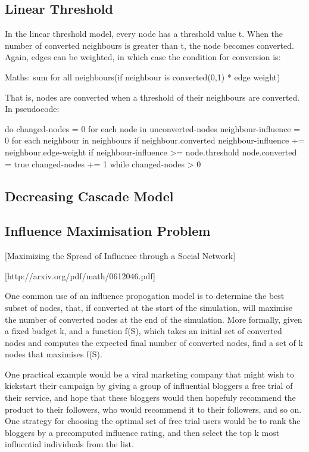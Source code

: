 \subsection{Linear Threshold}
 In the linear threshold model, every node has a threshold value t. When the number of converted neighbours is greater than t, the node becomes converted. Again, edges can be weighted, in which case the condition for conversion is:

Maths: sum for all neighbours(if neighbour is converted(0,1) * edge weight)

That is, nodes are converted when a threshold of their neighbours are converted. In pseudocode:

do {
  changed-nodes = 0
  for each node in unconverted-nodes {
    neighbour-influence = 0
    for each neighbour in neighbours {
      if neighbour.converted {
        neighbour-influence += neighbour.edge-weight
      }
    }
    if neighbour-influence >= node.threshold {
      node.converted = true
      changed-nodes += 1
    } 
  }
} while changed-nodes > 0

\subsection{Decreasing Cascade Model}


\subsection{Influence Maximisation Problem}

[Maximizing the Spread of Influence through a Social Network]

[http://arxiv.org/pdf/math/0612046.pdf]

One common use of an influence propogation model is to determine the best subset of nodes, that, if converted at the start of the simulation, will maximise the number of converted nodes at the end of the simulation. More formally, given a fixed budget k, and a function f(S), which takes an initial set of converted nodes and computes the expected final number of converted nodes, find a set of k nodes that maximises f(S).

One practical example would be a viral marketing company that might wish to kickstart their campaign by giving a group of influential bloggers a free trial of their service, and hope that these bloggers would then hopefuly recommend the product to their followers, who would recommend it to their followers, and so on. One strategy for choosing the optimal set of free trial users would be to rank the bloggers by a precomputed influence rating, and then select the top k most influential individuals from the list.

